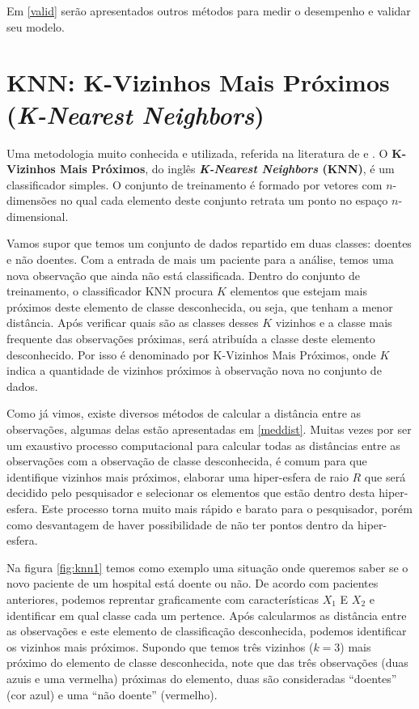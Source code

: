 \documentclass[
  openany]{book}
\begin{document}
Em \ref{valid} serão apresentados outros métodos para medir o desempenho e validar seu modelo.

\hypertarget{knn-k-vizinhos-mais-pruxf3ximos-k-nearest-neighbors}{%
\section{\texorpdfstring{KNN: K-Vizinhos Mais Próximos (\emph{K-Nearest Neighbors})}{KNN: K-Vizinhos Mais Próximos (K-Nearest Neighbors)}}\label{knn-k-vizinhos-mais-pruxf3ximos-k-nearest-neighbors}}

Uma metodologia muito conhecida e utilizada, referida na literatura de \citep{bhattacharya1981application} e \citep{bhattacharya2005geometric}. O \textbf{K-Vizinhos Mais Próximos}, do inglês \textbf{\emph{K-Nearest Neighbors} (KNN)}, é um classificador simples. O conjunto de treinamento é formado por vetores com \(n\)-dimensões no qual cada elemento deste conjunto retrata um ponto no espaço \(n\)-dimensional.

Vamos supor que temos um conjunto de dados repartido em duas classes: doentes e não doentes. Com a entrada de mais um paciente para a análise, temos uma nova observação que ainda não está classificada. Dentro do conjunto de treinamento, o classificador KNN procura \(K\) elementos que estejam mais próximos deste elemento de classe desconhecida, ou seja, que tenham a menor distância. Após verificar quais são as classes desses \(K\) vizinhos e a classe mais frequente das observações próximas, será atribuída a classe deste elemento desconhecido. Por isso é denominado por K-Vizinhos Mais Próximos, onde \(K\) indica a quantidade de vizinhos próximos à observação nova no conjunto de dados.

Como já vimos, existe diversos métodos de calcular a distância entre as observações, algumas delas estão apresentadas em \ref{meddist}. Muitas vezes por ser um exaustivo processo computacional para calcular todas as distâncias entre as observações com a observação de classe desconhecida, é comum para que identifique vizinhos mais próximos, elaborar uma hiper-esfera de raio \(R\) que será decidido pelo pesquisador e selecionar os elementos que estão dentro desta hiper-esfera. Este processo torna muito mais rápido e barato para o pesquisador, porém como desvantagem de haver possibilidade de não ter pontos dentro da hiper-esfera.

Na figura \ref{fig:knn1} temos como exemplo uma situação onde queremos saber se o novo paciente de um hospital está doente ou não. De acordo com pacientes anteriores, podemos reprentar graficamente com características \(X_1\) E \(X_2\) e identificar em qual classe cada um pertence. Após calcularmos as distância entre as observações e este elemento de classificação desconhecida, podemos identificar os vizinhos mais próximos. Supondo que temos três vizinhos (\(k=3\)) mais próximo do elemento de classe desconhecida, note que das três observações (duas azuis e uma vermelha) próximas do elemento, duas são consideradas ``doentes'' (cor azul) e uma ``não doente'' (vermelho).
\end{document}
